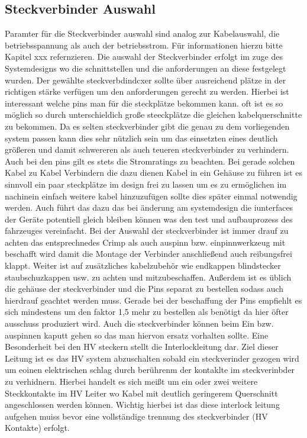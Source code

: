 \subsection{Steckverbinder Auswahl}
Paramter für die Steckverbinder auswahl sind analog zur Kabelauswahl, die betriebsspannung als auch der betriebsstrom. Für informationen hierzu bitte Kapitel xxx refernzieren. Die auswahl der Steckverbinder erfolgt im zuge des Systemdesigns wo die schnittstellen und die anforderungen an diese festgelegt wurden. Der gewählte steckverbdindcxer sollte über ausreichend plätze in der richtigen stärke verfügen um den anforderungen gerecht zu werden. Hierbei ist interessant welche pins man für die steckplätze bekommen kann. oft ist es so möglich so durch unterschieldich große steeckplätze die gleichen kabelquerschnitte zu bekommen. Da es selten steckverbinder gibt die genau zu dem vorliegenden system passen kann dies sehr nützlich sein um das einsetzten eines deutlich größeren und damit schwereren als auch teueren steckverbinder zu verhindern. Auch bei den pins gilt es stets die Stromratings zu beachten. Bei gerade solchen Kabel zu Kabel Verbindern die dazu dienen Kabel in ein Gehäuse zu führen ist es sinnvoll ein paar steckplätze im design frei zu lassen um es zu ermöglichen im nachinein einfach weitere kabel hinzuzufügen sollte dies später einmal notwendig werden. Auch führt das dazu das bei änderung am systemdesign die iunterfaces der Geräte potentiell gleich bleiben können was den test und aufbauprozess des fahrzeuges vereinfacht. 
Bei der Auswahl der steckverbinder ist immer drauf zu achten das entsprechnedes Crimp als auch auspinn bzw. einpinnwerkzeug mit beschafft wird damit die Montage der Verbinder anschließend auch reibungsfrei klappt. Weiter ist auf zusätzliches kabelzubehör wie endkappen blindstecker staubschuzkappen usw. zu achten und mitzubeschaffen. Außerdem ist es üblich die gehäuse der steckverbinder und die Pins separat zu bestellen sodass auch hierdrauf geachtet werden muss. Gerade bei der beschaffung der Pins empfiehlt es sich mindestens um den faktor 1,5 mehr zu bestellen als benötigt da hier öfter ausschuss produziert wird. Auch die steckverbinder können beim Ein bzw. auspinnen kaputt gehen so das man hiervon ersatz vorhalten sollte. 
Eine Besonderheit bei den HV steckern stellt die Interlockleitung dar. Ziel dieser Leitung ist es das HV system abzuschalten sobald ein steckverinder gezogen wird um eoinen elektrischen schlag durch berührenm der kontaklte im steckverinbder zu verhidnern. Hierbei handelt es sich meißt um ein oder zwei weitere Steckkontakte im HV Leiter wo Kabel mit deutlich geringerem Querschnitt angeschlossen werden können. Wichtig hierbei ist das diese interlock leitung aufgehen muiss bevor eine vollständige trennung des steckverbinder (HV Kontakte) erfolgt. 

